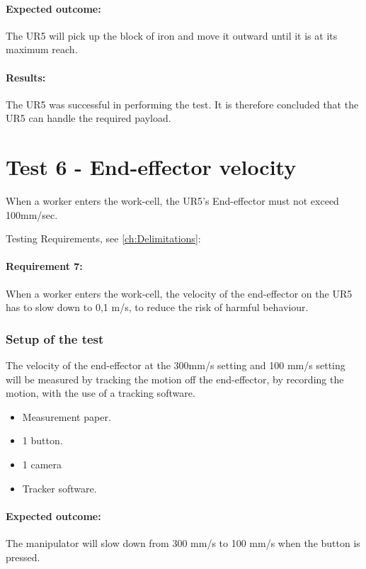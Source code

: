  \paragraph{Expected outcome:}
The UR5 will pick up the block of iron and move it outward until it is at its maximum reach. 

 
\paragraph{Results: }
The UR5 was successful in performing the test. It is therefore concluded that the UR5 can handle the required payload.\\ 

\section{Test 6 - End-effector velocity}
When a worker enters the work-cell, the UR5's End-effector must not exceed 100mm/sec.

Testing Requirements, see  \ref{ch:Delimitations}:

\paragraph{Requirement 7:} When a worker enters the work-cell, the velocity of the end-effector on the UR5 has to slow down to 0,1 m/s, to reduce the risk of harmful behaviour.\\

\subsubsection{Setup of the test}
The velocity of the end-effector at the  300mm/s setting and 100 mm/s setting will be measured by tracking the motion off the end-effector, by recording the motion, with the use of a tracking software.
\begin{itemize}
    \item Measurement paper.
    \item 1 button.
    \item 1 camera
    \item Tracker software.
\end{itemize}

\paragraph{Expected outcome:}
The manipulator will slow down from 300 mm/s to 100 mm/s when the button is pressed.

